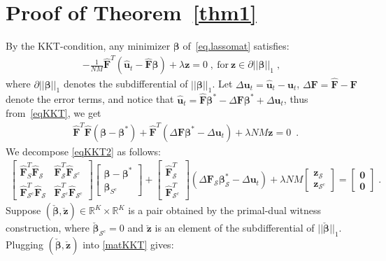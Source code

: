 \documentclass[a4paper,11pt]{article}
\newcommand{\bbeta}{\bm{\beta}}
\newcommand{\bF}{\mathbf{F}}
\newcommand{\mS}{\mathcal{S}}
\newcommand{\bu}{\mathbf{u}}
\theoremstyle{definition}
\begin{document}
\appendix

\section{Proof of Theorem~\ref{thm1}}\label{app.proofthm1}
By the KKT-condition, any minimizer $\bbeta$ of~\eqref{eq.lassomat} satisfies:
\begin{align}
-\frac{1}{NM}\widehat{\bF}^T(\widehat{\bu}_t-\widehat{\bF}\bbeta)+\lambda \mathbf{z}=0\;,~\text{for}~\mathbf{z}\in\partial||\bbeta||_1\;,\label{eqKKT}
\end{align}
where $\partial||\bbeta||_1$ denotes the subdifferential of $||\bbeta||_1$. Let $\Delta \bu_t=\widehat{\bu}_t-\bu_t$, $\Delta \bF=\widehat{\bF}-\bF$ denote the error terms, and notice that $\widehat{\bu}_t=\widehat{\bF}\bbeta^*-\Delta \bF\bbeta^*+\Delta \bu_t$, thus from~\eqref{eqKKT}, we get
\begin{align}
&\widehat{\bF}^T\widehat{\bF}(\bbeta-\bbeta^*)+\widehat{\bF}^T(\Delta \bF\bbeta^*-\Delta \bu_t)+\lambda NM\mathbf{z}=0\;~\label{eqKKT2}.
\end{align}
We decompose \eqref{eqKKT2} as follows:
\begin{align}
\begin{bmatrix}
\widehat{\bF}^T_S\widehat{\bF}_\mS&\widehat{\bF}^T_\mS\widehat{\bF}_{\mS^c}\\
\widehat{\bF}^T_{\mS^c}\widehat{\bF}_\mS&\widehat{\bF}^T_{\mS^c}\widehat{\bF}_{\mS^c}
\end{bmatrix}\begin{bmatrix}
\bbeta-\bbeta^*\\
\bbeta_{S^c}
\end{bmatrix}
+\begin{bmatrix}
\widehat{\bF}_\mS^T\\
\widehat{\bF}_{\mS^c}^T
\end{bmatrix}(\Delta \bF_\mS\bbeta_\mS^*-\Delta \bu_t)
+\lambda NM\begin{bmatrix}
\mathbf{z}_\mS\\
\mathbf{z}_{\mS^c}
\end{bmatrix}=\begin{bmatrix}
	\mathbf{0}\\\mathbf{0}
\end{bmatrix}\;.\label{matKKT}
\end{align}
Suppose $(\check{\bbeta},\check{\mathbf{z}})\in\mathbb{R}^K\times\mathbb{R}^K$ is a pair obtained by the primal-dual witness construction, where $\check{\bbeta}_{\mS^c}=0$ and $\check{\mathbf{z}}$ is an element of the subdifferential of $||\check{\bbeta}||_1$.  Plugging $(\check{\bbeta},\check{\mathbf{z}})$ into \eqref{matKKT} gives:
\end{document}
